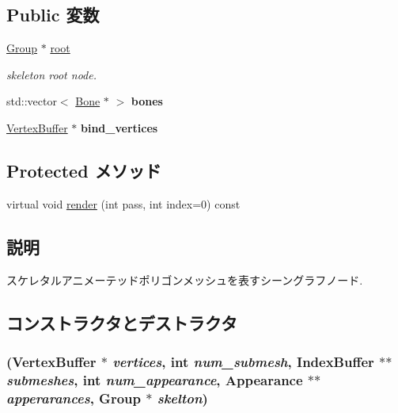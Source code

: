 \subsection*{Public 変数}
\begin{CompactItemize}
\item 
\hypertarget{classm3g_1_1SkinnedMesh_e7632c37fb719b0740846ec342b2d6bf}{
\hyperlink{classm3g_1_1Group}{Group} $\ast$ \hyperlink{classm3g_1_1SkinnedMesh_e7632c37fb719b0740846ec342b2d6bf}{root}}
\label{classm3g_1_1SkinnedMesh_e7632c37fb719b0740846ec342b2d6bf}

\begin{CompactList}\small\item\em skeleton root node. \item\end{CompactList}\item 
\hypertarget{classm3g_1_1SkinnedMesh_3bf107d6a2cb389a4887fdaa8aaebee6}{
std::vector$<$ \hyperlink{classm3g_1_1Bone}{Bone} $\ast$ $>$ \textbf{bones}}
\label{classm3g_1_1SkinnedMesh_3bf107d6a2cb389a4887fdaa8aaebee6}

\item 
\hypertarget{classm3g_1_1SkinnedMesh_43e75fc18cd8102b1e657fe5620f8f94}{
\hyperlink{classm3g_1_1VertexBuffer}{VertexBuffer} $\ast$ \textbf{bind\_\-vertices}}
\label{classm3g_1_1SkinnedMesh_43e75fc18cd8102b1e657fe5620f8f94}

\end{CompactItemize}
\subsection*{Protected メソッド}
\begin{CompactItemize}
\item 
virtual void \hyperlink{classm3g_1_1SkinnedMesh_1efcb1973989d9963d5bd6d03065d389}{render} (int pass, int index=0) const 
\end{CompactItemize}


\subsection{説明}
スケレタルアニメーテッドポリゴンメッシュを表すシーングラフノード. 

\subsection{コンストラクタとデストラクタ}
\hypertarget{classm3g_1_1SkinnedMesh_9ee04e655db4e2a95a0ab55d8ebb45c8}{
\subsubsection[{SkinnedMesh}]{ ({\bf VertexBuffer} $\ast$ {\em vertices}, \/  int {\em num\_\-submesh}, \/  {\bf IndexBuffer} $\ast$$\ast$ {\em submeshes}, \/  int {\em num\_\-appearance}, \/  {\bf Appearance} $\ast$$\ast$ {\em apperarances}, \/  {\bf Group} $\ast$ {\em skelton})}}
\label{classm3g_1_1SkinnedMesh_9ee04e655db4e2a95a0ab55d8ebb45c8}


